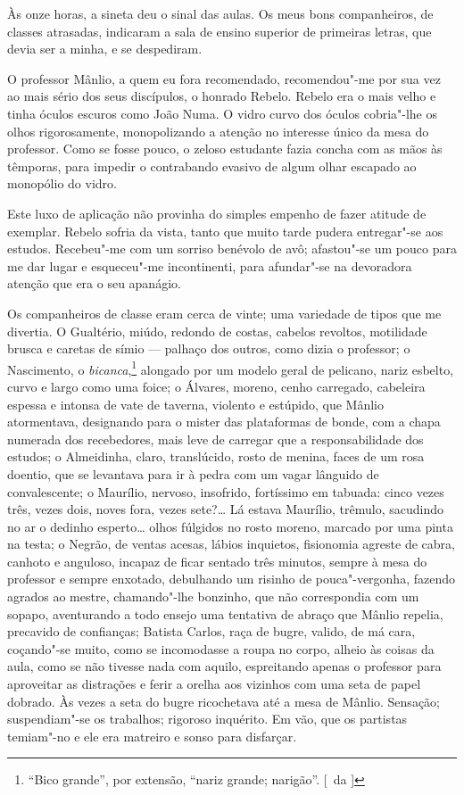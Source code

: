 Às onze horas, a sineta deu o sinal das aulas. Os meus
bons companheiros, de classes atrasadas, indicaram a sala de ensino superior de 
primeiras letras, que devia ser a
minha, e se despediram. 

O professor Mânlio, a quem eu fora recomendado,
recomendou"-me por sua vez ao mais sério dos seus discípulos, o
honrado Rebelo. Rebelo era o mais velho e tinha óculos escuros como
João Numa. O vidro curvo dos óculos cobria"-lhe os olhos
rigorosamente, monopolizando a atenção no interesse único da mesa do
professor. Como se fosse pouco, o zeloso estudante fazia concha com as
mãos às têmporas, para impedir o contrabando evasivo de algum olhar
escapado ao monopólio do vidro. 

Este luxo de aplicação não provinha do
simples empenho de fazer atitude de exemplar. Rebelo sofria da vista,
tanto que muito tarde pudera entregar"-se aos estudos. Recebeu"-me
com um sorriso benévolo de avô; afastou"-se um pouco para me dar lugar
e esqueceu"-me incontinenti, para afundar"-se na devoradora atenção
que era o seu apanágio. 

Os companheiros de classe eram cerca de vinte;
uma variedade de tipos que me divertia. O Gualtério, miúdo, redondo de
costas, cabelos revoltos, motilidade brusca e caretas de símio --- palhaço dos outros, 
como dizia o professor; o Nascimento, o \textit{bicanca},\footnote{ ``Bico grande'', 
por extensão, ``nariz grande; narigão''. [~da ]}
alongado por um modelo geral de pelicano, nariz esbelto, curvo e largo
como uma foice; o Álvares, moreno, cenho carregado, cabeleira espessa e
intonsa de vate de taverna, violento e estúpido, que Mânlio
atormentava, designando para o mister das plataformas de bonde, com a
chapa numerada dos recebedores, mais leve de carregar que a
responsabilidade dos estudos; o Almeidinha, claro, translúcido, rosto
de menina, faces de um rosa doentio, que se levantava para ir à pedra
com um vagar lânguido de convalescente; o Maurílio, nervoso, insofrido,
fortíssimo em tabuada: cinco vezes três, vezes dois, noves fora, vezes
sete?\ldots{} Lá estava Maurílio, trêmulo, sacudindo no ar o dedinho
esperto\ldots{} olhos fúlgidos no rosto moreno, marcado por uma pinta na
testa; o Negrão, de ventas acesas, lábios inquietos, fisionomia agreste
de cabra, canhoto e anguloso, incapaz de ficar sentado três minutos,
sempre à mesa do professor e sempre enxotado, debulhando um risinho de
pouca"-vergonha, fazendo agrados ao mestre, chamando"-lhe bonzinho, que
não correspondia com um sopapo, aventurando a todo ensejo uma tentativa
de abraço que Mânlio repelia, precavido de confianças; Batista Carlos,
raça de bugre, valido, de má cara, coçando"-se muito, como se
incomodasse a roupa no corpo, alheio às coisas da aula, como se não
tivesse nada com aquilo, espreitando apenas o professor para aproveitar
as distrações e ferir a orelha aos vizinhos com uma seta de papel
dobrado. Às vezes a seta do bugre ricochetava até a mesa de Mânlio.
Sensação; suspendiam"-se os trabalhos; rigoroso inquérito. Em vão, que
os partistas temiam"-no e ele era matreiro e sonso para disfarçar.

